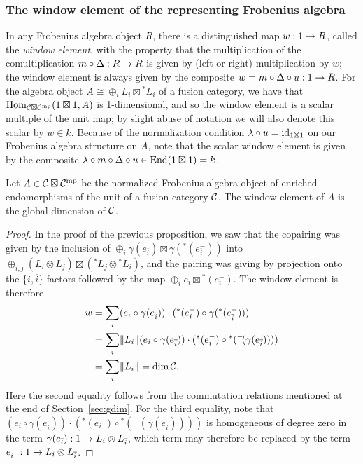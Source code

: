 \documentclass{amsart}
\begin{document}
\subsubsection{The window element of the representing Frobenius algebra}

In any Frobenius algebra object $R$, there is a distinguished map $w: 1 \rightarrow R$, called the \emph{window element}, with the property that the multiplication of the comultiplication $m \circ \Delta: R \rightarrow R$ is given by (left or right) multiplication by $w$; the window element is always given by the composite $w = m \circ \Delta \circ u: 1 \rightarrow R$.  For the algebra object $A \cong \oplus_i L_i \boxtimes {}^* L_i$ of a fusion category, we have that $\operatorname{Hom}_{\mathcal C \boxtimes \mathcal C^{\mathrm{mp}}}(1 \boxtimes 1, A)$ is 1-dimensional, and so the window element is a scalar multiple of the unit map; by slight abuse of notation we will also denote this scalar by $w \in k$.  Because of the normalization condition $\lambda \circ u = \mathrm{id}_{1 \boxtimes 1}$ on our Frobenius algebra structure on $A$, note that the scalar window element is given by the composite $\lambda \circ m \circ \Delta \circ u \in \operatorname{End}(1 \boxtimes 1) = k$.
\begin{proposition}
Let $A \in \mathcal C \boxtimes \mathcal C^{\mathrm{mp}}$ be the normalized Frobenius algebra object of enriched endomorphisms of the unit of a fusion category $\mathcal C$.  The window element of $A$ is the global dimension of $\mathcal C$.
\end{proposition}
\begin{proof}
In the proof of the previous proposition, we saw that the copairing was given by the inclusion of $\oplus_i \gamma(e_{\overline{i}}) \boxtimes \gamma({}^*(e_{\overline{i}}^{-}))$ into $\oplus_{i,j}  (L_i \otimes L_j) \boxtimes ({}^* L_j \otimes {}^* L_i)$, and the pairing was giving by projection onto the $\{i,\overline{i}\}$ factors followed by the map $\oplus_i e_i \boxtimes {}^*(e_i^{-})$.  The window element is therefore
\begin{align*}
w &= \sum_i (e_i \circ \gamma(e_{\overline{i}})) \cdot ({}^*(e_i^{-}) \circ \gamma({}^*(e_{\overline{i}}^{-}))) \\
&= \sum_i \lVert L_i \rVert (e_i \circ \gamma(e_{\overline{i}})) \cdot ({}^*(e_i^{-}) \circ {}^* ({}^-\!(\gamma(e_{\overline{i}})))) \\
&= \sum_i \lVert L_i \rVert = \dim \mathcal C.
\end{align*}
Here the second equality follows from the commutation relations mentioned at the end of Section~\ref{sec:gdim}.  For the third equality, note that $(e_i \circ \gamma(e_{\overline{i}})) \cdot ({}^*(e_i^{-}) \circ {}^* ({}^-\!(\gamma(e_{\overline{i}}))))$ is homogeneous of degree zero in the term $\gamma(e_{\overline{i}}): 1 \rightarrow L_i \otimes L_{\overline{i}}$, which term may therefore be replaced by the term $e_i^{-}: 1 \rightarrow L_i \otimes L_{\overline{i}}$.
\end{proof}
\end{document}
